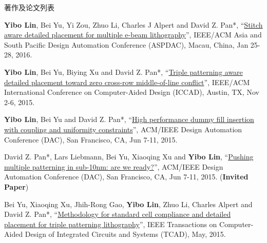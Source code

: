 \begin{rSection}{著作及论文列表}
\begin{description}[font=\normalfont, rightmargin=2em]
\item[{[C5]}]{
        \textbf{Yibo Lin}, Bei Yu, Yi Zou, Zhuo Li, Charles J Alpert and David Z. Pan*, 
    ``\href{http://ieeexplore.ieee.org/xpl/articleDetails.jsp?arnumber=7428009}{Stitch aware detailed placement for multiple e-beam lithography}'', 
    IEEE/ACM Asia and South Pacific Design Automation Conference (ASPDAC), Macau, China, Jan 25-28, 2016.
    
}
            

\item[{[C4]}]{
        \textbf{Yibo Lin}, Bei Yu, Biying Xu and David Z. Pan*, 
    ``\href{http://dl.acm.org/citation.cfm?id=2840875}{Triple patterning aware detailed placement toward zero cross-row middle-of-line conflict}'', 
    IEEE/ACM International Conference on Computer-Aided Design (ICCAD), Austin, TX, Nov 2-6, 2015.
    
}
            

\item[{[C3]}]{
        \textbf{Yibo Lin}, Bei Yu and David Z. Pan*, 
    ``\href{http://dl.acm.org/citation.cfm?id=2744769.2744850}{High performance dummy fill insertion with coupling and uniformity constraints}'', 
    ACM/IEEE Design Automation Conference (DAC), San Francisco, CA, Jun 7-11, 2015.
    
}
            

\item[{[C2]}]{
        David Z. Pan*, Lars Liebmann, Bei Yu, Xiaoqing Xu and \textbf{Yibo Lin}, 
    ``\href{http://dl.acm.org/citation.cfm?id=2744769.2747940}{Pushing multiple patterning in sub-10nm: are we ready?}'', 
    ACM/IEEE Design Automation Conference (DAC), San Francisco, CA, Jun 7-11, 2015.
    (\textbf{Invited Paper})
}
            

\item[{[J1]}]{
        Bei Yu, Xiaoqing Xu, Jhih-Rong Gao, \textbf{Yibo Lin}, Zhuo Li, Charles Alpert and David Z. Pan*, 
    ``\href{https://doi.org/10.1109/TCAD.2015.2401571}{Methodology for standard cell compliance and detailed placement for triple patterning lithography}'', 
    IEEE Transactions on Computer-Aided Design of Integrated Circuits and Systems (TCAD), May, 2015.
    
}
            

\end{description}
    

\end{rSection}


